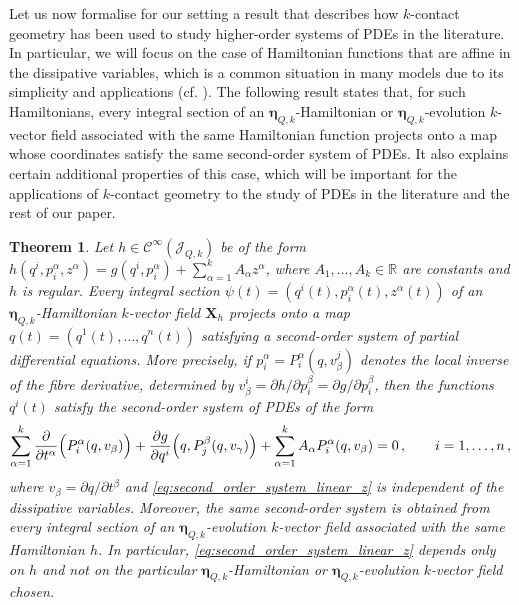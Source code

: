 \documentclass[11pt,twoside]{article}
\theoremstyle{plain}
\newtheorem{theorem}{Theorem}[section]
\theoremstyle{definition}
\theoremstyle{remark}
\newcommand{\Cinfty}{\mathscr{C}^\infty}
\begin{document}
Let us now formalise for our setting a result that describes how $k$-contact geometry has been used to study higher-order systems of PDEs in the literature. In particular, we will focus on the case of Hamiltonian functions that are affine in the dissipative variables, which is a common situation in many models due to its simplicity and applications (cf. \cite{Riv_22,Riv_23,RSS_24,GRR_22}). The following result states that, for such Hamiltonians, every integral section of an \(\bm\eta_{Q,k}\)-Hamiltonian or \(\bm\eta_{Q,k}\)-evolution $k$-vector field associated with the same Hamiltonian function projects onto a map whose coordinates satisfy the same second-order system of PDEs. It also explains certain additional properties of this case, which will be important for the applications of $k$-contact geometry to the study of PDEs in the literature and the rest of our paper.

\begin{theorem}\label{thm:linear_z_same_second_order_system}
Let \(h\in \Cinfty(\mathcal J_{Q,k})\) be of the form \(h(q^i,p_i^\alpha,z^\alpha)=g(q^i,p_i^\alpha)+\sum_{\alpha=1}^kA_\alpha z^\alpha\), where \(A_1,\dots,A_k\in\mathbb R\) are constants and \(h\) is regular. Every integral section \(\psi(t)=(q^i(t),p_i^\alpha(t),z^\alpha(t))\) of an \(\bm\eta_{Q,k}\)-Hamiltonian \(k\)-vector field \({\bm X}_{h}\) projects onto a map \(q(t)=(q^1(t),\dots,q^n(t))\) satisfying a second-order system of partial differential equations. More precisely, if \(p_i^\alpha=P_i^\alpha(q ,v_\beta^j)\) denotes the local inverse of the fibre derivative, determined by \(v_\beta^i=\partial h/\partial p_i^\beta=\partial g/\partial p_i^\beta\), then the functions \(q^i(t)\) satisfy the second-order system of PDEs of the form
\begin{equation}\label{eq:second_order_system_linear_z}
\sum_{\alpha=1}^k \frac{\partial}{\partial t^\alpha}\Bigl(P_i^\alpha(q,v_\beta)\Bigr)
+\frac{\partial g}{\partial q^i}\Bigl(q,P_j^\beta(q,v_\gamma)\Bigr)
+\sum_{\alpha=1}^k A_\alpha P_i^\alpha(q,v_\beta)=0\,,\qquad i=1,\dotsc,n\,,
\end{equation}
where \(v_\beta =\partial q /\partial t^\beta\) and \eqref{eq:second_order_system_linear_z} is independent of the dissipative variables. Moreover, the same second-order system is obtained from every integral section of an \(\bm\eta_{Q,k}\)-evolution $k$-vector field associated with the same Hamiltonian \(h\). In particular, \eqref{eq:second_order_system_linear_z} depends only on \(h\) and not on the particular \(\bm\eta_{Q,k}\)-Hamiltonian or \(\bm\eta_{Q,k}\)-evolution $k$-vector field chosen.
\end{theorem}
\end{document}
